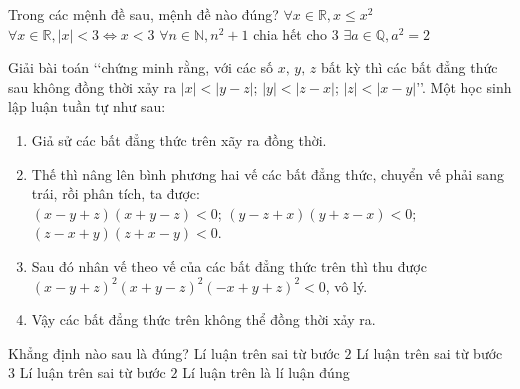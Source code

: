 \begin{ex}%
	Trong các mệnh  đề sau, mệnh đề nào đúng?
	 \choice
		{\True $\forall x\in \mathbb{R}, x\le x^2  $}
		{ $\forall  x\in \mathbb{R}, |x|<3\Leftrightarrow x<3 $}
		{$\forall n\in  \mathbb{N}, n^2+1 $ chia hết cho $3$}
		{$\exists a\in \mathbb{Q}, a^2=2$} 
\end{ex}

\begin{ex}%
	Giải bài toán \lq\lq chứng minh rằng, với các số $x,\,y,\,z$ bất  kỳ thì các bất đẳng thức sau không đồng thời xảy ra $\left|x\right|<\left|y-z\right|$; $\left|y\right|<\left|z-x\right|$; $\left|z\right|<\left|x-y\right|$\rq\rq. Một học sinh lập luận tuần tự như sau:
	\begin{enumerate}[Bước 1.]
		\item Giả sử các bất đẳng  thức trên xãy ra đồng thời.
		\item Thế thì nâng lên bình phương  hai vế các bất đẳng thức, chuyển vế phải sang trái, rồi phân tích, ta được:\\
		$(x-y+z)(x+y-z)<0$; $(y-z+x)(y+z-x)<0$; $(z-x+y)(z+x-y)<0$. 
		\item Sau đó nhân vế theo vế của các bất đẳng  thức trên thì thu được\\
		 $(x-y+z)^2(x+y-z)^2(-x+y+z)^2<0$, vô lý.
		\item Vậy các bất đẳng thức trên không thể  đồng thời xảy ra.
	\end{enumerate}
	Khẳng  định nào sau là đúng?
	 \choice
		 {Lí luận trên sai từ bước $2$}
		{Lí  luận trên sai từ bước $3$}
		{Lí luận trên sai từ bước  $2$}
		{\True Lí luận trên là lí luận  đúng}
\end{ex}

